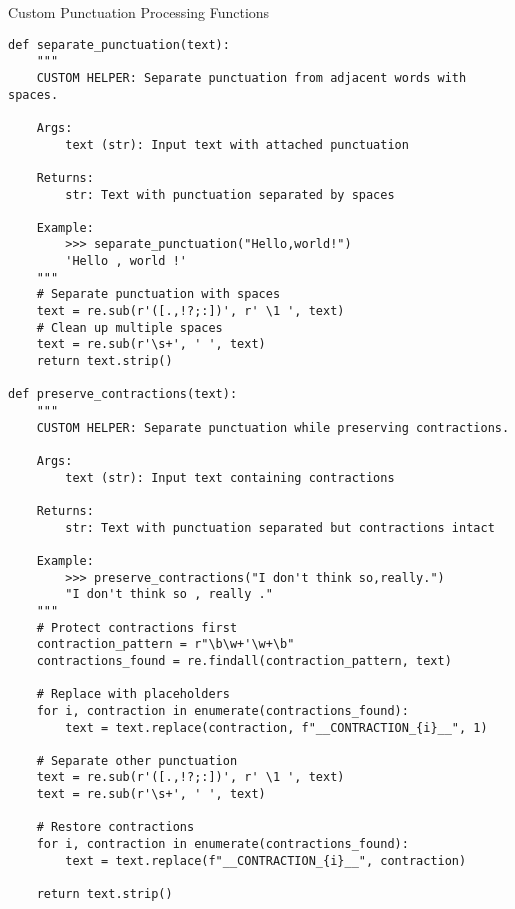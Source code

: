 \documentclass[11pt,a4paper]{article}
\begin{document}
\begin{custombox}{Custom Punctuation Processing Functions}

\begin{lstlisting}[caption=Custom punctuation handling functions]
def separate_punctuation(text):
    """
    CUSTOM HELPER: Separate punctuation from adjacent words with spaces.
    
    Args:
        text (str): Input text with attached punctuation
        
    Returns:
        str: Text with punctuation separated by spaces
        
    Example:
        >>> separate_punctuation("Hello,world!")
        'Hello , world !'
    """
    # Separate punctuation with spaces
    text = re.sub(r'([.,!?;:])', r' \1 ', text)
    # Clean up multiple spaces
    text = re.sub(r'\s+', ' ', text)
    return text.strip()

def preserve_contractions(text):
    """
    CUSTOM HELPER: Separate punctuation while preserving contractions.
    
    Args:
        text (str): Input text containing contractions
        
    Returns:
        str: Text with punctuation separated but contractions intact
        
    Example:
        >>> preserve_contractions("I don't think so,really.")
        "I don't think so , really ."
    """
    # Protect contractions first
    contraction_pattern = r"\b\w+'\w+\b"
    contractions_found = re.findall(contraction_pattern, text)
    
    # Replace with placeholders
    for i, contraction in enumerate(contractions_found):
        text = text.replace(contraction, f"__CONTRACTION_{i}__", 1)
    
    # Separate other punctuation
    text = re.sub(r'([.,!?;:])', r' \1 ', text)
    text = re.sub(r'\s+', ' ', text)
    
    # Restore contractions
    for i, contraction in enumerate(contractions_found):
        text = text.replace(f"__CONTRACTION_{i}__", contraction)
    
    return text.strip()
\end{lstlisting}
\end{custombox}
\end{document}

